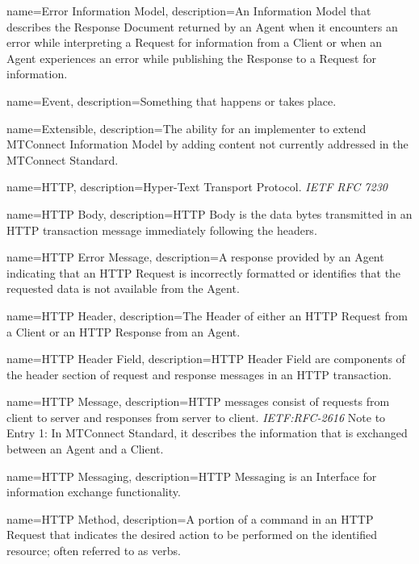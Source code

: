 {
    name={Error Information Model},
	description={An \gls{Information Model} that describes the \gls{Response Document} returned by an \gls{Agent} when it encounters an error while interpreting a \gls{Request} for information from a \gls{Client} or when an \gls{Agent} experiences an error while publishing the \gls{Response} to a \gls{Request} for information.}
}

{
    name={Event},
	description={Something that happens or takes place.}
}

{
    name={Extensible},
	description={The ability for an implementer to extend \gls{MTConnect Information Model} by adding content not currently addressed in the MTConnect Standard.
}
}

{
    name={HTTP},
	description={Hyper-Text Transport Protocol. \textit{IETF RFC 7230}
}
}

{
    name={HTTP Body},
	description={\gls{HTTP Body} is the data bytes transmitted in an HTTP transaction message immediately following the headers.}
}

{
    name={HTTP Error Message},
	description={A response provided by an \gls{Agent} indicating that an \gls{HTTP Request} is incorrectly formatted or identifies that the requested data is not available from the \gls{Agent}. }
}

{
    name={HTTP Header},
	description={The \gls{Header} of either an \gls{HTTP Request} from a \gls{Client} or an \gls{HTTP Response} from an \gls{Agent}.}
}

{
    name={HTTP Header Field},
	description={\gls{HTTP Header Field} are components of the header section of request and response messages in an HTTP transaction.}
}

{
    name={HTTP Message},
	description={HTTP messages consist of requests from client to server and responses from server to client. \textit{IETF:RFC-2616}
Note to Entry 1: In MTConnect Standard, it describes the information that is exchanged between an \gls{Agent} and a \gls{Client}.}
}

{
    name={HTTP Messaging},
	description={\gls{HTTP Messaging} is an \gls{Interface} for information exchange functionality.}
}

{
    name={HTTP Method},
	description={A portion of a command in an \gls{HTTP Request} that indicates the desired action to be performed on the identified resource; often referred to as verbs.
}
}

